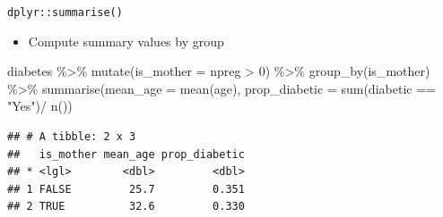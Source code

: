 \documentclass[
  ignorenonframetext,
]{beamer}
\newenvironment{Shaded}{\begin{snugshade}}{\end{snugshade}}
\newcommand{\AttributeTok}[1]{\textcolor[rgb]{0.77,0.63,0.00}{#1}}
\newcommand{\DecValTok}[1]{\textcolor[rgb]{0.00,0.00,0.81}{#1}}
\newcommand{\FunctionTok}[1]{\textcolor[rgb]{0.00,0.00,0.00}{#1}}
\newcommand{\NormalTok}[1]{#1}
\newcommand{\SpecialCharTok}[1]{\textcolor[rgb]{0.00,0.00,0.00}{#1}}
\newcommand{\StringTok}[1]{\textcolor[rgb]{0.31,0.60,0.02}{#1}}
\providecommand{\tightlist}{%
  \setlength{\itemsep}{0pt}\setlength{\parskip}{0pt}}
\begin{document}
\begin{frame}[fragile]{\texttt{dplyr::summarise()}}
\protect\hypertarget{dplyrsummarise}{}
\begin{itemize}
\tightlist
\item
  Compute summary values by group
\end{itemize}

\begin{Shaded}
\begin{Highlighting}[]
\NormalTok{diabetes }\SpecialCharTok{\%\textgreater{}\%} 
  \FunctionTok{mutate}\NormalTok{(}\AttributeTok{is\_mother =}\NormalTok{ npreg }\SpecialCharTok{\textgreater{}} \DecValTok{0}\NormalTok{) }\SpecialCharTok{\%\textgreater{}\%} 
  \FunctionTok{group\_by}\NormalTok{(is\_mother) }\SpecialCharTok{\%\textgreater{}\%} 
  \FunctionTok{summarise}\NormalTok{(}\AttributeTok{mean\_age =} \FunctionTok{mean}\NormalTok{(age),}
            \AttributeTok{prop\_diabetic =} \FunctionTok{sum}\NormalTok{(diabetic }\SpecialCharTok{==} \StringTok{"Yes"}\NormalTok{)}\SpecialCharTok{/} \FunctionTok{n}\NormalTok{())}
\end{Highlighting}
\end{Shaded}

\begin{verbatim}
## # A tibble: 2 x 3
##   is_mother mean_age prop_diabetic
## * <lgl>        <dbl>         <dbl>
## 1 FALSE         25.7         0.351
## 2 TRUE          32.6         0.330
\end{verbatim}
\end{frame}
\end{document}
